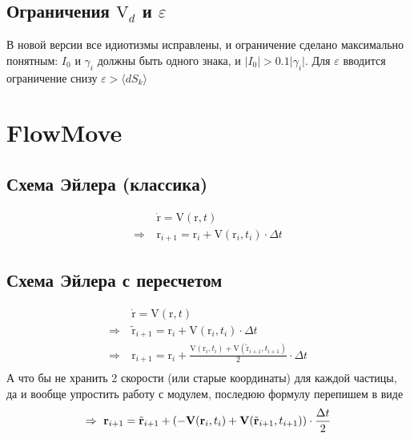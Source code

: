 \documentclass[14pt]{extreport}
\newcommand{\br}[1]{\boldsymbol{\mathrm{#1}}}
\begin{document}
\subsection{Ограничения $\br V_d$ и $\varepsilon$}
В новой версии все идиотизмы исправлены, и ограничение сделано максимально понятным: $I_0$ и $\gamma_i$ должны быть одного знака, и $\lvert I_0 \rvert > 0.1 \lvert\gamma_i\rvert$. 
Для $\varepsilon$ вводится ограничение снизу $\varepsilon > \langle dS_k \rangle$

\newpage
\section{FlowMove}
\subsection{Схема Эйлера (классика)}
\begin{equation*}\begin{split}
&\dot{\br r} = \br V (\br r, t) \\
\Rightarrow~&\br r_{i+1} = \br r_i + \br V(\br r_i, t_i) \cdot \Delta t
\end{split}\end{equation*}

\subsection{Схема Эйлера с пересчетом}
\begin{equation*}\begin{split}
&\dot{\br r} = \br V (\br r, t) \\
\Rightarrow~&\tilde{\br r}_{i+1} = \br r_i + \br V(\br r_i, t_i) \cdot \Delta t \\
\Rightarrow~&\br r_{i+1} = \br r_i + 
\frac{\br V(\br r_i, t_i) + \br V( \tilde{\br r}_{i+1}, t_{i+1})}{2}\cdot \Delta t \\
\end{split}\end{equation*}
А что бы не хранить 2 скорости (или старые координаты) для
каждой частицы, да и вообще упростить работу с модулем,
последюю формулу перепишем в виде
\begin{equation*}
\Rightarrow~\br r_{i+1} = \tilde{\br r}_{i+1} + 
\left( -\br V(\br r_i, t_i) + \br V( \tilde{\br r}_{i+1}, t_{i+1}) \right)\cdot \frac{\Delta t}{2} \\
\end{equation*}
\end{document}
